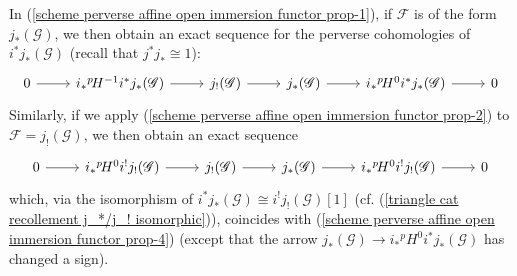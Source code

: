 In (\ref{scheme perverse affine open immersion functor prop-1}), if $\mathscr{F}$ is of the form $j_*(\mathscr{G})$, we then obtain an exact sequence for the perverse cohomologies of $i^*j_*(\mathscr{G})$ (recall that $j^*j_*\cong 1$):
\begin{equation}\label{scheme perverse affine open immersion functor prop-3}
\begin{tikzcd}
0\ar[r]&i_*{^p\!H^{-1}}i^*j_*(\mathscr{G})\ar[r]&j_!(\mathscr{G})\ar[r]&j_*(\mathscr{G})\ar[r]&i_*{^p\!H^0}i^*j_*(\mathscr{G})\ar[r]&0
\end{tikzcd}
\end{equation}
Similarly, if we apply (\ref{scheme perverse affine open immersion functor prop-2}) to $\mathscr{F}=j_!(\mathscr{G})$, we then obtain an exact sequence
\begin{equation}\label{scheme perverse affine open immersion functor prop-4}
\begin{tikzcd}
0\ar[r]&i_*{^p\!H^{0}}i^!j_!(\mathscr{G})\ar[r]&j_!(\mathscr{G})\ar[r]&j_*(\mathscr{G})\ar[r]&i_*{^p\!H^0}i^!j_!(\mathscr{G})\ar[r]&0
\end{tikzcd}
\end{equation}
which, via the isomorphism of $i^*j_*(\mathscr{G})\cong i^!j_!(\mathscr{G})[1]$ (cf. (\ref{triangle cat recollement j_*/j_! isomorphic})), coincides with (\ref{scheme perverse affine open immersion functor prop-4}) (except that the arrow $j_*(\mathscr{G})\to i_*{^p\!H^0}i^*j_*(\mathscr{G})$ has changed a sign). 

